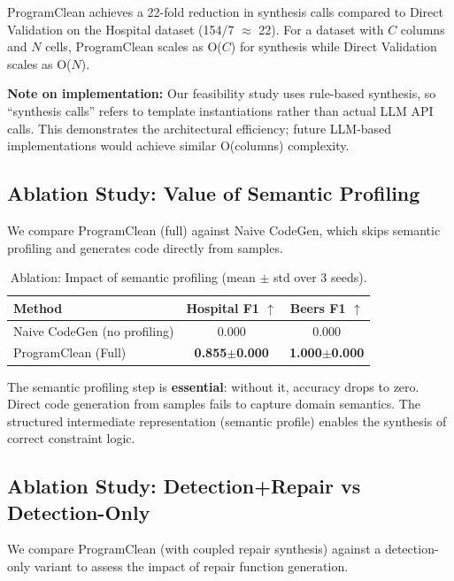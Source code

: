 \documentclass{article}
\begin{document}
ProgramClean achieves a 22-fold reduction in synthesis calls compared to Direct Validation on the Hospital dataset (154/7 $\approx$ 22). For a dataset with $C$ columns and $N$ cells, ProgramClean scales as O($C$) for synthesis while Direct Validation scales as O($N$).

\textbf{Note on implementation:} Our feasibility study uses rule-based synthesis, so ``synthesis calls'' refers to template instantiations rather than actual LLM API calls. This demonstrates the architectural efficiency; future LLM-based implementations would achieve similar O(columns) complexity.

\subsection{Ablation Study: Value of Semantic Profiling}
\label{sec:ablation}

We compare ProgramClean (full) against Naive CodeGen, which skips semantic profiling and generates code directly from samples.

\begin{table}[h]
\caption{Ablation: Impact of semantic profiling (mean $\pm$ std over 3 seeds).}
\label{tab:ablation}
\centering
\small
\begin{tabular}{lcc}
\toprule
Method & Hospital F1 $\uparrow$ & Beers F1 $\uparrow$ \\
\midrule
Naive CodeGen (no profiling) & 0.000 & 0.000 \\
ProgramClean (Full) & \textbf{0.855$\pm$0.000} & \textbf{1.000$\pm$0.000} \\
\bottomrule
\end{tabular}
\end{table}

The semantic profiling step is \textbf{essential}: without it, accuracy drops to zero. Direct code generation from samples fails to capture domain semantics. The structured intermediate representation (semantic profile) enables the synthesis of correct constraint logic.

\subsection{Ablation Study: Detection+Repair vs Detection-Only}
\label{sec:ablation_detection_repair}

We compare ProgramClean (with coupled repair synthesis) against a detection-only variant to assess the impact of repair function generation.
\end{document}

